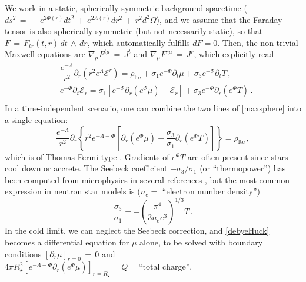 \documentclass[a4paper, amsfonts, amssymb, amsmath, reprint, showkeys, nofootinbib, twoside,notitlepage]{revtex4-1}
\theoremstyle{definition}
\theoremstyle{theorem}
\begin{document}
We work in a static, spherically symmetric background spacetime ($ds^2\,{=}\,-e^{2\Phi(r)}dt^2\,{+}\,e^{2\Lambda(r)}dr^2\,{+}\,r^2 d^2\Omega$), and we assume that the Faraday tensor is also spherically symmetric (but not necessarily static), so that $F\,{=}\,F_{tr}(t,r)\,dt\,{\wedge} \,dr$, which automatically fulfills $dF=0$. Then, the non-trivial Maxwell equations are $\nabla_\mu F^{t\mu}\,{=}\,J^t$ and $\nabla_\mu F^{r\mu}\,{=}\,J^r$, which explicitly read
\vspace{-0.1cm}
\begin{equation}\label{maxsphere}
\begin{split}
&\dfrac{e^{-\Lambda}}{r^2} \partial_r \left(r^2 e^{\Lambda}\mathcal{E}^r\right)= \rho_\text{lte} +\sigma_1 e^{-\Phi}\partial_t \mu+\sigma_3 e^{-\Phi}\partial_t T \, ,\\
&e^{-\Phi}\partial_t \mathcal{E}_r =\sigma_1\left[e^{-\Phi}\partial_r (e^\Phi \mu){-}\mathcal{E}_r\right]\!{+}\sigma_3e^{-\Phi}\partial_r \left(e^\Phi T\right)\, .\\
\end{split}
\end{equation}
In a time-independent scenario, one can combine the two lines of \eqref{maxsphere} into a single equation:
\vspace{-0.1cm}
\begin{equation}\label{debyeHuck}
\dfrac{e^{-\Lambda}}{r^2}\partial_r \left\{r^2 e^{-\Lambda-\Phi}\left[\partial_r \left( e^\Phi \mu\right)+\dfrac{\sigma_3}{\sigma_1}\partial_r \left( e^\Phi T\right)\right]\right\}=\rho_\text{lte} \, ,
\end{equation}
which is of Thomas-Fermi type \cite{Thomas_1927,Fermi1927}.
Gradients of $e^\Phi T$ are often present since stars cool down or accrete. The Seebeck coefficient $-\sigma_3/\sigma_1$ (or ``thermopower'') has been computed from microphysics in several references \cite{Geppert1991,Yakovlev1984,Schmitt:2017efp,Harutyunyan:2024hsd,Bajec:2025dqm}, but the most common expression in neutron star models is \cite{Gakis:2024obw} ($n_e =$ ``electron number density'')
\begin{equation}
\dfrac{\sigma_3}{\sigma_1} =-\left(\dfrac{\pi^4}{3n_e e^3} \right)^{1/3} T \, .
\end{equation}
In the cold limit, we can neglect the Seebeck correction, and \eqref{debyeHuck} becomes a differential equation for $\mu$ alone,
to be solved with boundary conditions $[\partial_r\mu]_{r=0}\,{=}\,0$ and $4\pi R_\star^2 \left[e^{-\Lambda-\Phi}\partial_r \left( e^\Phi \mu\right)\right]_{r=R_\star} =Q=\text{``total charge''}$. 
\end{document}
